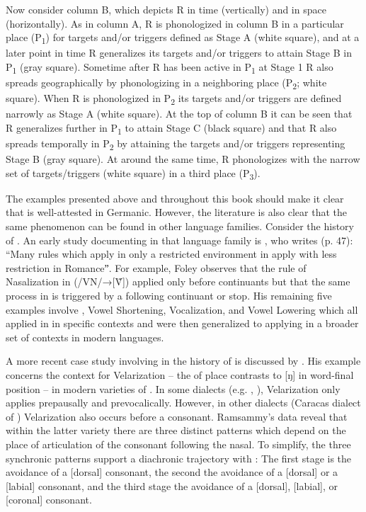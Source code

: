 \begin{xlist}
\begin{xlist}
Now consider column B, which depicts R in time (vertically) and in space (horizontally). As in column A, R is phonologized in column B in a particular place (P\textsubscript{1}) for targets and/or triggers defined as Stage A (white square), and at a later point in time R generalizes its targets and/or triggers to attain Stage B in P\textsubscript{1} (gray square). Sometime after R has been active in P\textsubscript{1} at Stage 1 R also spreads geographically by phonologizing in a neighboring place (P\textsubscript{2}; white square). When R is phonologized in P\textsubscript{2} its targets and/or triggers are defined narrowly as Stage A (white square). At the top of column B it can be seen that R generalizes further in P\textsubscript{1} to attain Stage C (black square) and that R also spreads temporally in P\textsubscript{2} by attaining the targets and/or triggers representing Stage B (gray square). At around the same time, R phonologizes with the narrow set of targets/triggers (white square) in a third place (P\textsubscript{3}).

The examples presented above and throughout this book should make it clear that  is well-attested in Germanic. However, the literature is also clear that the same phenomenon can be found in other language families. Consider the history of . An early study documenting  in that language family is \citet{Foley1975}, who writes (p. 47): “Many rules which apply in only a restricted environment in  apply with less restriction in Romanceˮ. For example, Foley observes that the rule of Nasalization in  (/VN/→[\~{V}]) applied only before continuants but that the same process in  is triggered by a following continuant or stop. His remaining five examples involve , Vowel Shortening, Vocalization, and Vowel Lowering which all applied in  in specific contexts and were then generalized to applying in a broader set of contexts in modern  languages.

A more recent case study involving  in the history of  is discussed by \citet{Ramsammy2015}. His example concerns the context for Velarization -- the  of place contrasts to [ŋ] in word-final position -- in modern varieties of . In some dialects (e.g. , ), Velarization only applies prepausally and prevocalically. However, in other dialects (Caracas dialect of ) Velarization also occurs before a consonant. Ramsammy’s data reveal that within the latter variety there are three distinct patterns which depend on the place of articulation of the consonant following the nasal. To simplify, the three synchronic patterns support a diachronic trajectory with : The first stage is the avoidance of a [dorsal] consonant, the second the avoidance of a [dorsal] or a [labial] consonant, and the third stage the avoidance of a [dorsal], [labial], or [coronal] consonant.


\end{xlist}
\end{xlist}
